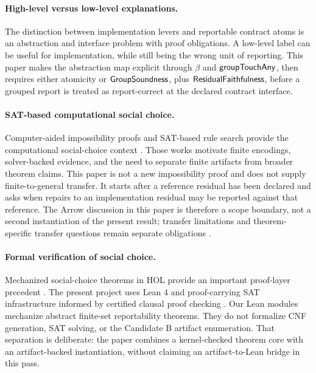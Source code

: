\paragraph{High-level versus low-level explanations.}
The distinction between implementation levers and reportable contract atoms is
an abstraction and interface problem with proof obligations.  A low-level
label can be useful for implementation, while still being the wrong unit of
reporting.  This paper makes the abstraction map explicit through \(\beta\) and
\(\mathsf{groupTouchAny}\), then requires either atomicity or \(\mathsf{GroupSoundness}\), plus
\(\mathsf{ResidualFaithfulness}\), before a grouped report is treated as report-correct
at the declared contract interface.

\paragraph{SAT-based computational social choice.}
Computer-aided impossibility proofs and SAT-based rule search provide the
computational social-choice context
\citep{tanglin2009computer,geist2011automated,brandtgeist2016strategyproof}.
Those works motivate finite encodings, solver-backed evidence, and the need to
separate finite artifacts from broader theorem claims.  This paper is not a new
impossibility proof and does not supply finite-to-general transfer.  It starts
after a reference residual has been declared and asks when repairs to an
implementation residual may be reported against that reference.  The Arrow
discussion in this paper is therefore a scope boundary, not a second
instantiation of the present result; transfer limitations and theorem-specific transfer questions
remain separate obligations \citep{grandiendriss2013}.

\paragraph{Formal verification of social choice.}
Mechanized social-choice theorems in HOL provide an important proof-layer
precedent \citep{nipkow2009social}.  The present project uses Lean 4
\citep{moura2021lean4} and proof-carrying SAT infrastructure informed by
certified clausal proof checking \citep{cruzfilipe2017lrat,wetzler2014drat}.
Our Lean modules mechanize abstract finite-set reportability theorems.  They
do not formalize CNF generation, SAT solving, or the Candidate B artifact
enumeration.  That separation is deliberate: the paper combines a
kernel-checked theorem core with an artifact-backed instantiation, without
claiming an artifact-to-Lean bridge in this pass.


